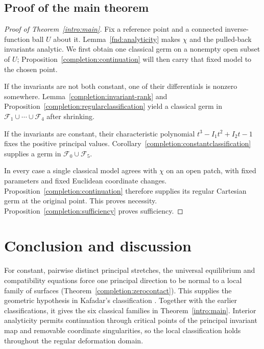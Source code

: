 \documentclass[11pt,a4paper]{article}
\numberwithin{equation}{section}
\theoremstyle{plain}
\theoremstyle{definition}
\theoremstyle{remark}
\begin{document}
\subsection{Proof of the main theorem}

\begin{proof}[Proof of Theorem~\ref{intro:main}]
Fix a reference point and a connected inverse-function ball $U$ about it.
Lemma~\ref{fnd:analyticity} makes $\chi$ and the pulled-back invariants
analytic. We first obtain one classical germ on a nonempty open subset
of $U$; Proposition~\ref{completion:continuation} will then carry that
fixed model to the chosen point.

If the invariants are not both constant, one of their differentials is
nonzero somewhere. Lemma~\ref{completion:invariant-rank} and
Proposition~\ref{completion:regularclassification} yield a classical
germ in $\mathcal F_1\cup\cdots\cup\mathcal F_4$ after shrinking.

If the invariants are constant, their characteristic polynomial
$t^3-I_1t^2+I_2t-1$ fixes the positive principal values.
Corollary~\ref{completion:constantclassification} supplies a germ in
$\mathcal F_0\cup\mathcal F_5$. 

In every case a single classical model agrees with $\chi$ on an open
patch, with fixed parameters and fixed Euclidean coordinate changes.
Proposition~\ref{completion:continuation} therefore supplies its regular
Cartesian germ at the original point. This proves necessity.
Proposition~\ref{completion:sufficiency} proves sufficiency.
\end{proof}

\section{Conclusion and discussion}\label{sec:conclusion}

For constant, pairwise distinct principal stretches, the universal
equilibrium and compatibility equations force one principal direction
to be normal to a local family of surfaces
(Theorem~\ref{completion:zerocontact}). This supplies the geometric
hypothesis in Kafadar's classification \cite{Kafadar1972}.
Together with the earlier classifications, it gives the six classical
families in Theorem~\ref{intro:main}. Interior analyticity permits
continuation through critical points of the principal invariant map and
removable coordinate singularities, so the local classification holds
throughout the regular deformation domain.
\end{document}
